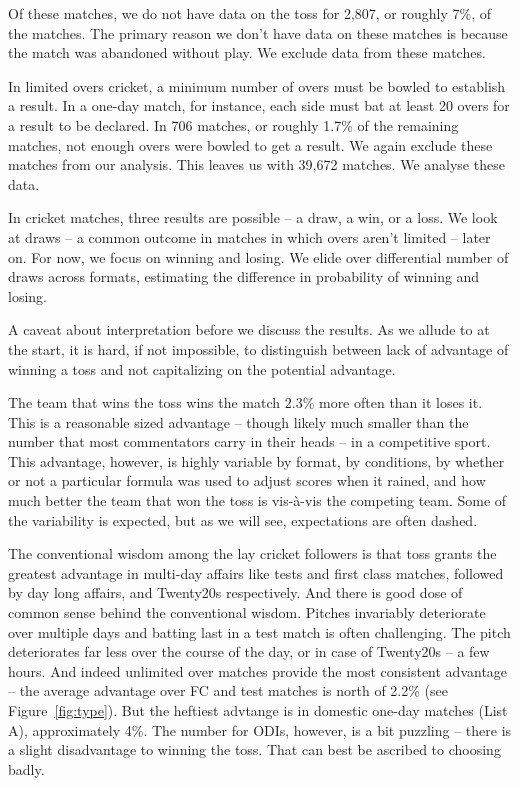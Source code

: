 \documentclass[11pt]{article}
\begin{document}
Of these matches, we do not have data on the toss for 2,807, or roughly 7\%, of the matches. The primary reason we don't have data on these matches is because the match was abandoned without play. We exclude data from these matches. 

In limited overs cricket, a minimum number of overs must be bowled to establish a result. In a one-day match, for instance, each side must bat at least 20 overs for a result to be declared. In 706 matches, or roughly 1.7\% of the remaining matches, not enough overs were bowled to get a result. We again exclude these matches from our analysis. This leaves us with 39,672 matches. We analyse these data.

In cricket matches, three results are possible -- a draw, a win, or a loss. We look at draws -- a common outcome in matches in which overs aren't limited -- later on. For now, we focus on winning and losing. We elide over differential number of draws across formats, estimating the difference in probability of winning and losing.  

A caveat about interpretation before we discuss the results. As we allude to at the start, it is hard, if not impossible, to distinguish between lack of advantage of winning a toss and not capitalizing on the potential advantage. 

The team that wins the toss wins the match 2.3\% more often than it loses it. This is a reasonable sized advantage -- though likely much smaller than the number that most commentators carry in their heads -- in a competitive sport. This advantage, however, is highly variable by format, by conditions, by whether or not a particular formula was used to adjust scores when it rained, and how much better the team that won the toss is vis-\`{a}-vis the competing team. Some of the variability is expected, but as we will see, expectations are often dashed. 

The conventional wisdom among the lay cricket followers is that toss grants the greatest advantage in multi-day affairs like tests and first class matches, followed by day long affairs, and Twenty20s respectively. And there is good dose of common sense behind the conventional wisdom. Pitches invariably deteriorate over multiple days and batting last in a test match is often challenging. The pitch deteriorates far less over the course of the day, or in case of Twenty20s -- a few hours. And indeed unlimited over matches provide the most consistent advantage -- the average advantage over FC and test matches is north of 2.2\% (see Figure~\ref{fig:type}). But the heftiest advtange is in domestic one-day matches (List A), approximately 4\%. The number for ODIs, however, is a bit puzzling -- there is a slight disadvantage to winning the toss. That can best be ascribed to choosing badly.      
\end{document}
